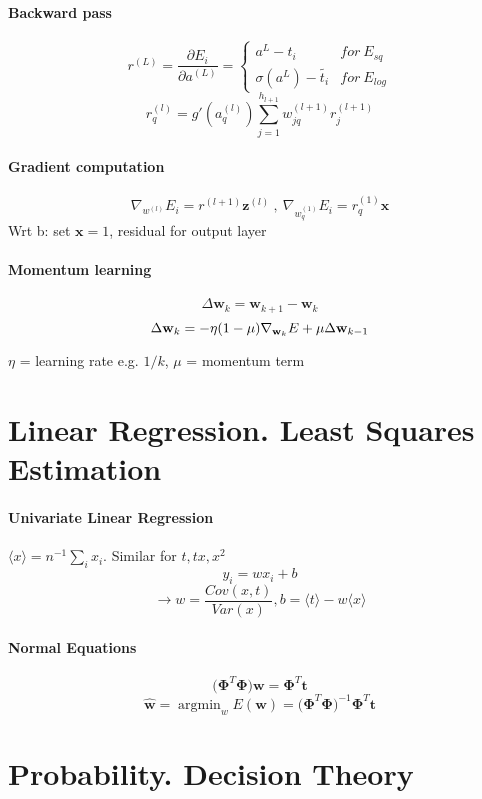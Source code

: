 \documentclass[7pt]{scrartcl}
\DeclareMathOperator*{\argmin}{argmin}
\begin{document}
\begin{multicols}{4}
\paragraph{Backward pass}
\[r^{(L)}=\frac{\partial E_i}{\partial a^{(L)}} = \left\{ \begin{array}{ll}a^L - t_i & for~ E_{sq}  \\ \sigma(a^L) - \tilde{t_i} & for~ E_{log} \end{array} \right. \]
\[r_q^{(l)}=g'(a_q^{(l)})\sum_{j=1}^{h_{l+1}}w_{jq}^{(l+1)}r_j^{(l+1)}\]

\paragraph{Gradient computation}
\[\nabla_{w^{(l)}} E_i = r^{(l+1)} \mathbf{z}^{(l)} ~,~\nabla_{w_q^{(1)}} E_i = r_q^{(1)} \mathbf{x}\]
Wrt b: set $\mathbf{x} = 1$, residual for output layer

\paragraph{Momentum learning}
\[\Delta \mathbf w_k = \mathbf w_{k+1}-\mathbf w_k\]
\[\Delta \mathbf w_k = -\eta(1-\mu)\nabla_{\textbf w_k}E+\mu \Delta \mathbf w_{k-1}\]

$\eta$ = learning rate e.g. $1/k$, $\mu$ = momentum term

\section{Linear Regression. Least Squares Estimation}
\paragraph{Univariate Linear Regression}
$\langle x \rangle = n^{-1} \sum_i x_i $. Similar for $t, tx, x^2$
\[y_i = wx_i + b \]
\[\rightarrow w=\frac{Cov(x,t)}{Var(x)}, b=\langle t \rangle - w \langle x \rangle \]

\paragraph{Normal Equations}
\[ \mathbf{(\Phi}^{T}\mathbf{\Phi) w = \Phi}^{T} \mathbf{t}\]
\[ \hat{\mathbf{w}} = \argmin_w E(\mathbf{w}) = \mathbf{(\Phi}^{T}\mathbf{\Phi)}^{-1} \mathbf{\Phi}^{T}  \mathbf{t} \]

\section{Probability. Decision Theory}

\end{multicols}
\end{document}
